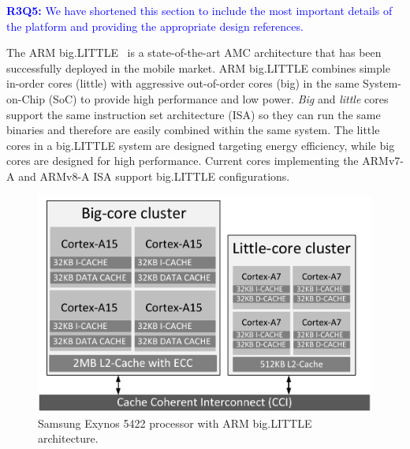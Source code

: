 \textcolor{blue}{
\textbf{R3Q5:} We have shortened this section to include the most important details of the platform and providing the appropriate design references. 
}

The ARM big.LITTLE~\cite{samsung, Greenhalgh2011} is a state-of-the-art AMC architecture that has been successfully deployed in the mobile market. 
ARM big.LITTLE combines simple in-order cores (little) with aggressive out-of-order cores (big) in the same System-on-Chip (SoC) to provide high performance and low power. 
\textit{Big} and \textit{little} cores support the same instruction set architecture (ISA) so they can run the same binaries and therefore are easily combined within the same system.
The little cores in a big.LITTLE system are designed targeting energy efficiency, while big cores are designed for high performance.
Current cores implementing the ARMv7-A and ARMv8-A ISA support big.LIT\-TLE configurations. 


\begin{figure}[t]
	\centering
	\includegraphics[width=0.5\columnwidth]{figures/block_diagram.pdf}%
	\caption{Samsung Exynos 5422 processor with ARM big.LITTLE architecture.}%
	\label{fig:big-little-diagram}%
	\vspace{-0.56cm}
\end{figure}


